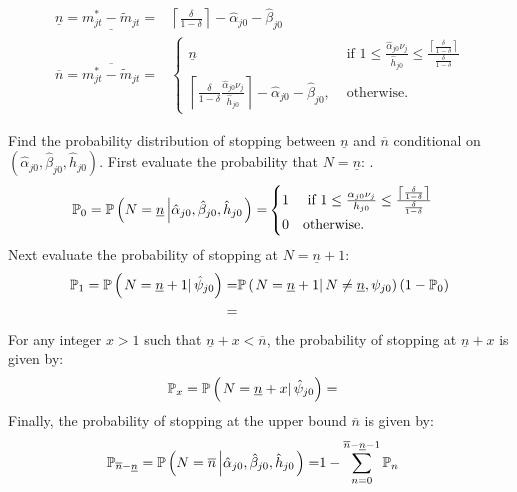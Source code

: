 \documentclass[11 pt]{article}
\newcommand{\pr}[1]{\left( #1 \right)}
\newcommand{\cls}[2]{\left. #1 \right\vert #2}
\newcommand{\crs}[2]{#1 \left\vert #2 \right.}
\newcommand{\ceil}[1]{\left\lceil #1 \right\rceil}
\newcommand{\study}{m} %
\newcommand{\ddelta}{\left\lceil \frac{\delta}{1 - \delta} \right\rceil}
\begin{document}
\begin{outline}
\begin{align*}
    \underline{n} 
    = 
    \underline{\study_{jt}^* - \tilde{\study}_{jt}} 
    =& \ceil{\frac{\delta}{1 - \delta}} - \hat{\alpha}_{j0} - \hat{\beta}_{j0}
    \\
    \overline{n}
    =
    \overline{\study_{jt}^* - \tilde{\study}_{jt}}
    =&
    \begin{cases}
        \underline{n}
        &\text{ if } 1 \leq \frac{\hat{\alpha}_{j0} \nu_j}{\hat{h}_{j0}} \leq \frac{\ddelta}{\frac{\delta}{1 - \delta}}
        \\
        \ceil{\frac{\delta}{1 - \delta} \frac{\hat{\alpha}_{j0} \nu_j}{\hat{h}_{j0}}} - \hat{\alpha}_{j0} - \hat{\beta}_{j0},
        &\text{ otherwise.}
    \end{cases}
\end{align*}

\item Find the probability distribution of stopping between $\underline{n}$ and $\overline{n}$ conditional on $\pr{\hat{\alpha}_{j0}, \hat{\beta}_{j0}, \hat{h}_{j0}}$.
First evaluate the probability that $N = \underline{n}$:
.\begin{align*}
    \PP_0 = \PP \pr{\crs{
        N = \underline{n}
    }{\hat{\alpha}_{j0}, \hat{\beta}_{j0}, \hat{h}_{j0}}}
    =&
    \begin{cases}
    1 &\text{ if } 1 \leq \frac{\alpha_{j0} \nu_j}{h_{j0}} \leq \frac{\ddelta}{\frac{\delta}{1 - \delta}}
    \\
    0 &\text{otherwise}.
    \end{cases}
\end{align*}
Next evaluate the probability of stopping at $N = \underline{n} + 1$:
\begin{align*}
    \PP_1 
    = 
    \PP \pr{\cls{N = \underline{n} + 1}{\hat{\psi}_{j0}}} 
    =&
    \PP \pr{\cls{N = \underline{n} + 1}{N \neq \underline{n}, \psi_{j0}}} 
    \pr{1 - \PP_0}
    \\
    =&
\end{align*}
For any integer $x > 1$ such that $\underline{n} + x < \overline{n}$, the probability of stopping at $\underline{n} + x$ is given by:
\begin{align*}
    \PP_x
    =
    \PP \pr{\cls{N = \underline{n} + x}{\hat{\psi}_{j0}}}
    =&
\end{align*}
Finally, the probability of stopping at the upper bound $\overline{n}$ is given by:
\begin{align*}
    \PP_{\overline{n} - \underline{n}} = \PP \pr{\crs{
        N = \overline{n}
    }{\hat{\alpha}_{j0}, \hat{\beta}_{j0}, \hat{h}_{j0}}}
    =&
    1 - \sum_{n = 0}^{\overline{n} - \underline{n} - 1} \PP_n
\end{align*}


\end{outline}
\end{document}
